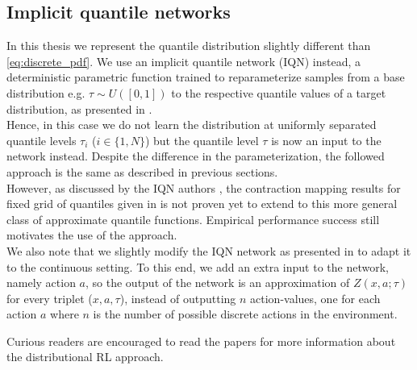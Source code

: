 \subsection{Implicit quantile networks}
In this thesis we represent the quantile distribution slightly different than
\eqref{eq:discrete_pdf}. We use an implicit quantile network (IQN) instead, a deterministic
parametric function trained to reparameterize samples from a base distribution e.g. $\tau \sim U([0,1])$ 
to the respective quantile values of a target distribution, as presented in \citet{Dabney2018b}.\\
Hence, in this case we do not learn the distribution at uniformly separated
quantile levels $\tau_i$ ($i \in \{1,N\}$) but the quantile level $\tau$ is now an
input to the network instead.
Despite the difference in the parameterization, the followed approach is the same as described
in previous sections.\\
However, as discussed by the IQN authors \citep{Dabney2018b}, the contraction mapping
results for fixed grid of quantiles given in \citet{Dabney2018b} is not proven yet to extend 
to this more general class of approximate quantile functions.
Empirical performance success still motivates the use of the approach.\\
We also note that we slightly modify the IQN network as presented in \citet{Dabney2018b} to adapt it
to the continuous setting. To this end, we add an extra input to the network, namely action $a$, so the output
of the network is an approximation of $Z(x,a; \tau)$ for every triplet ($x,a,\tau$), instead of 
outputting $n$ action-values, one for each action $a$ where $n$ is the number of
possible discrete actions in the environment.

Curious readers are encouraged to read the papers \citet{Bellemare2017,Dabney2018a,Dabney2018b}
for more information about the distributional RL approach.

